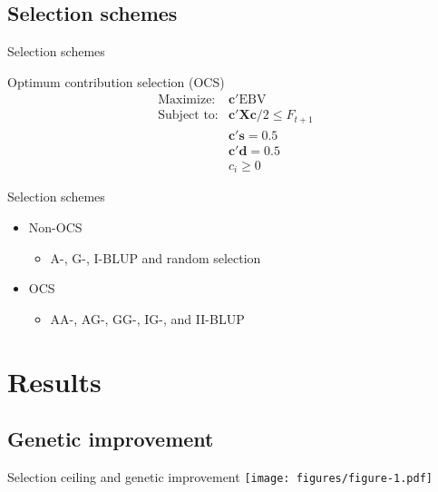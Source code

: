\documentclass{beamer}
\begin{document}
\subsection{Selection schemes}
\begin{frame}{Selection schemes}
  \begin{block}{Optimum contribution selection (OCS)}
    $$\begin{matrix}
      \text{Maximize:} & \mathbf{c}'\text{EBV}\\
      \text{Subject to:} & \mathbf{c'Xc}/2\le F_{t+1}\\
      & \mathbf{c's} = 0.5\\
      & \mathbf{c'd} = 0.5\\
      & c_i \ge 0
    \end{matrix}$$
  \end{block}
  \begin{block}{Selection schemes}
    \begin{itemize}
    \item Non-OCS
      \begin{itemize}
      \item A-, G-, I-BLUP and random selection
      \end{itemize}
    \item OCS
      \begin{itemize}
      \item AA-, AG-, GG-, IG-, and II-BLUP
      \end{itemize} 
    \end{itemize}
  \end{block}
\end{frame}

\section{Results}

\subsection{Genetic improvement}
\begin{frame}{Selection ceiling and genetic improvement}
  \texttt{[image: figures/figure-1.pdf]}
\end{frame}
\end{document}
